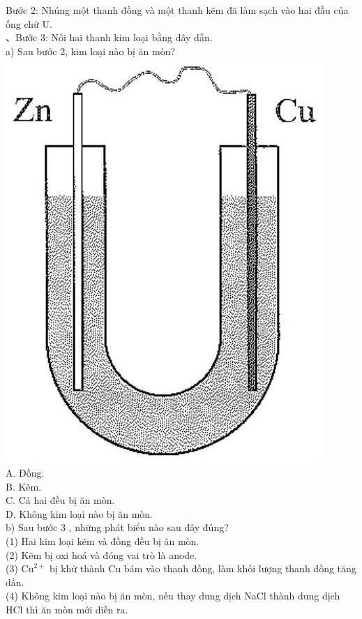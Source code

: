 \documentclass[10pt]{article}
\begin{document}
Bước 2: Nhúng một thanh đồng và một thanh kẽm đã làm sạch vào hai đầu của ống chữ U.\\
、Bước 3: Nối hai thanh kim loại bằng dây dẫn.\\
a) Sau bước 2, kim loại nào bị ăn mòn?\\
\includegraphics[max width=\textwidth, center]{2025_10_23_80c1361fcdcd395cad8eg-51}\\
A. Đồng.\\
B. Kẽm.\\
C. Cả hai đều bị ăn mòn.\\
D. Không kim loại nào bị ăn mòn.\\
b) Sau bước 3 , những phát biểu nào sau đây đúng?\\
(1) Hai kim loại kẽm và đồng đều bị ăn mòn.\\
(2) Kẽm bị oxi hoá và đóng vai trò là anode.\\
(3) $\mathrm{Cu}^{2+}$ bị khử thành Cu bám vào thanh đồng, làm khối lượng thanh đồng tăng dần.\\
(4) Không kim loại nào bị ăn mòn, nếu thay dung dịch NaCl thành dung dịch HCl thì ăn mòn mới diễn ra.\\
\end{document}
